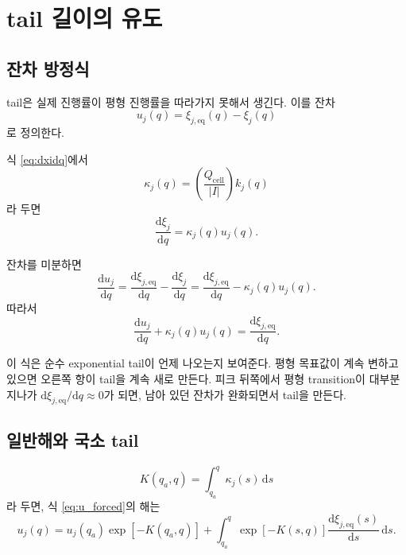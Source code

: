 \documentclass[11pt]{article}
\newcommand{\dd}{\mathrm{d}}
\newcommand{\cell}{\mathrm{cell}}
\begin{document}
\section{tail 길이의 유도}

\subsection{잔차 방정식}

tail은 실제 진행률이 평형 진행률을 따라가지 못해서 생긴다. 이를 잔차
\begin{equation}
u_j(q)
=
\xi_{j,\mathrm{eq}}(q)-\xi_j(q)
\end{equation}
로 정의한다.

식 \eqref{eq:dxidq}에서
\begin{equation}
\kappa_j(q)
=
\left(\frac{Q_{\cell}}{|I|}\right)k_j(q)
\end{equation}
라 두면
\begin{equation}
\frac{\dd \xi_j}{\dd q}
=
\kappa_j(q)u_j(q).
\end{equation}

잔차를 미분하면
\begin{equation}
\frac{\dd u_j}{\dd q}
=
\frac{\dd \xi_{j,\mathrm{eq}}}{\dd q}
-
\frac{\dd \xi_j}{\dd q}
=
\frac{\dd \xi_{j,\mathrm{eq}}}{\dd q}
-
\kappa_j(q)u_j(q).
\end{equation}
따라서
\begin{equation}
\boxed{
\frac{\dd u_j}{\dd q}
+
\kappa_j(q)u_j(q)
=
\frac{\dd \xi_{j,\mathrm{eq}}}{\dd q}.
}
\label{eq:u_forced}
\end{equation}

이 식은 순수 exponential tail이 언제 나오는지 보여준다. 평형 목표값이 계속 변하고 있으면 오른쪽 항이 tail을 계속 새로 만든다. 피크 뒤쪽에서 평형 transition이 대부분 지나가 \(\dd \xi_{j,\mathrm{eq}}/\dd q\approx0\)가 되면, 남아 있던 잔차가 완화되면서 tail을 만든다.

\subsection{일반해와 국소 tail}

\begin{equation}
K(q_a,q)
=
\int_{q_a}^{q}\kappa_j(s)\,\dd s
\end{equation}
라 두면, 식 \eqref{eq:u_forced}의 해는
\begin{equation}
u_j(q)
=
u_j(q_a)\exp[-K(q_a,q)]
+
\int_{q_a}^{q}
\exp[-K(s,q)]
\frac{\dd \xi_{j,\mathrm{eq}}(s)}{\dd s}
\,\dd s .
\label{eq:u_general}
\end{equation}
\end{document}
